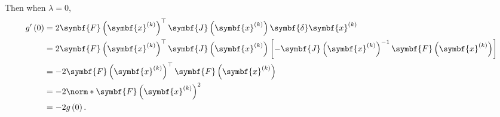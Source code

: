 \documentclass{article}
\begin{document}
Then when \(\lambda = 0\),
\begin{align*}
    g'\left( 0 \right) & = 2 \symbf{F}\left( \symbf{x}^{\left( k \right)} \right)^\top \symbf{J}\left( \symbf{x}^{\left( k \right)} \right) \symbf{\delta}\symbf{x}^{\left( k \right)}                                                                                     \\
                       & = 2 \symbf{F}\left( \symbf{x}^{\left( k \right)} \right)^\top \symbf{J}\left( \symbf{x}^{\left( k \right)} \right) \left[ -\symbf{J}\left( \symbf{x}^{\left( k \right)} \right)^{-1} \symbf{F}\left( \symbf{x}^{\left( k \right)} \right) \right] \\
                       & = - 2 \symbf{F}\left( \symbf{x}^{\left( k \right)} \right)^\top \symbf{F}\left( \symbf{x}^{\left( k \right)} \right)                                                                                                                              \\
                       & = - 2 \norm*{\symbf{F}\left( \symbf{x}^{\left( k \right)} \right)}^2                                                                                                                                                                              \\
                       & = - 2 g\left( 0 \right).
\end{align*}
\end{document}
